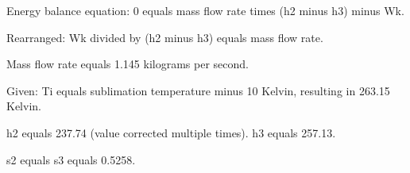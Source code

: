 Energy balance equation:  
0 equals mass flow rate times (h2 minus h3) minus Wk.  

Rearranged:  
Wk divided by (h2 minus h3) equals mass flow rate.  

Mass flow rate equals 1.145 kilograms per second.  

Given:  
Ti equals sublimation temperature minus 10 Kelvin, resulting in 263.15 Kelvin.  

h2 equals 237.74 (value corrected multiple times).  
h3 equals 257.13.  

s2 equals s3 equals 0.5258.